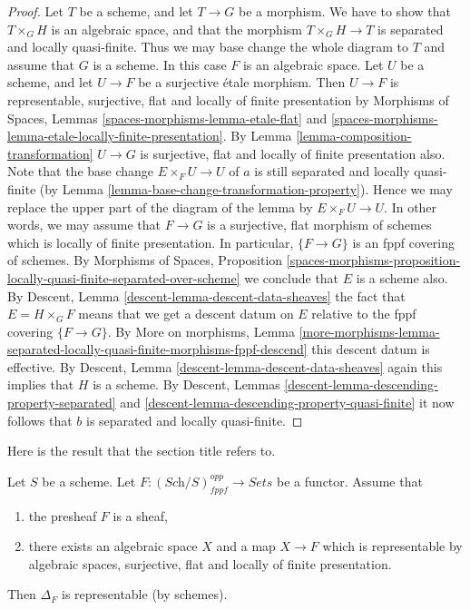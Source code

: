 \begin{proof}
Let $T$ be a scheme, and let $T \to G$ be a morphism.
We have to show that $T \times_G H$ is an algebraic space, and that
the morphism $T \times_G H \to T$ is separated and
locally quasi-finite. Thus we may base change the whole diagram to $T$
and assume that $G$ is a scheme. In this case $F$ is an algebraic space.
Let $U$ be a scheme, and let $U \to F$ be a surjective \'etale morphism.
Then $U \to F$ is representable, surjective, flat and
locally of finite presentation by
Morphisms of Spaces,
Lemmas \ref{spaces-morphisms-lemma-etale-flat} and
\ref{spaces-morphisms-lemma-etale-locally-finite-presentation}.
By
Lemma \ref{lemma-composition-transformation}
$U \to G$ is surjective, flat and locally of finite presentation also.
Note that the base change $E \times_F U \to U$ of $a$ is still
separated and locally quasi-finite (by
Lemma \ref{lemma-base-change-transformation-property}). Hence we
may replace the upper part of the diagram of the lemma by
$E \times_F U \to U$. In other words, we may assume that
$F \to G$ is a surjective, flat morphism of schemes
which is locally of finite presentation.
In particular, $\{F \to G\}$ is an fppf covering of schemes.
By
Morphisms of Spaces, Proposition
\ref{spaces-morphisms-proposition-locally-quasi-finite-separated-over-scheme}
we conclude that $E$ is a scheme also.
By
Descent, Lemma \ref{descent-lemma-descent-data-sheaves}
the fact that $E = H \times_G F$ means that we get a descent datum
on $E$ relative to the fppf covering $\{F \to G\}$.
By
More on morphisms, Lemma
\ref{more-morphisms-lemma-separated-locally-quasi-finite-morphisms-fppf-descend}
this descent datum is effective.
By
Descent, Lemma \ref{descent-lemma-descent-data-sheaves}
again this implies that $H$ is a scheme.
By
Descent, Lemmas \ref{descent-lemma-descending-property-separated} and
\ref{descent-lemma-descending-property-quasi-finite}
it now follows that $b$ is separated and locally quasi-finite.
\end{proof}

\noindent
Here is the result that the section title refers to.

\begin{lemma}
\label{lemma-bootstrap-diagonal}
Let $S$ be a scheme.
Let $F : (\textit{Sch}/S)_{fppf}^{opp} \to \textit{Sets}$ be a functor.
Assume that
\begin{enumerate}
\item the presheaf $F$ is a sheaf,
\item there exists an algebraic space $X$ and a map $X \to F$
which is representable by algebraic spaces, surjective, flat and
locally of finite presentation.
\end{enumerate}
Then $\Delta_F$ is representable (by schemes).
\end{lemma}

